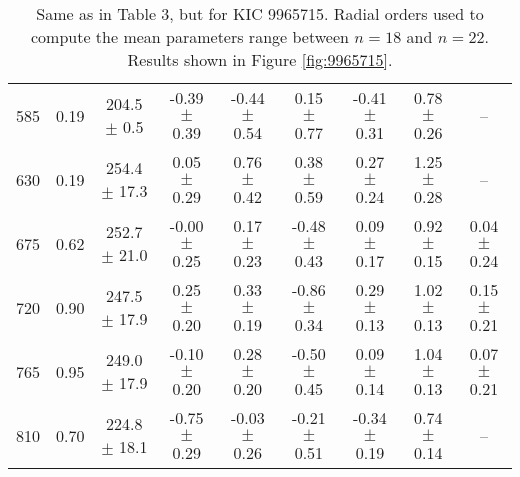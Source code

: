 \documentclass[twocolumn]{aastex61}%
\begin{document}
\begin{table*}[ht]
\begin{tabular}{ccc|ccccc|c}
585 & 0.19 & 204.5 $\pm$ 0.5 & -0.39 $\pm$ 0.39 & -0.44 $\pm$ 0.54 & 0.15 $\pm$ 0.77 & -0.41 $\pm$ 0.31 & 0.78 $\pm$ 0.26 & --\\
630 & 0.19 & 254.4 $\pm$ 17.3 & 0.05 $\pm$ 0.29 & 0.76 $\pm$ 0.42 & 0.38 $\pm$ 0.59 & 0.27 $\pm$ 0.24 & 1.25 $\pm$ 0.28 & --\\
675 & 0.62 & 252.7 $\pm$ 21.0 & -0.00 $\pm$ 0.25 & 0.17 $\pm$ 0.23 & -0.48 $\pm$ 0.43 & 0.09 $\pm$ 0.17 & 0.92 $\pm$ 0.15 & 0.04 $\pm$ 0.24\\
720 & 0.90 & 247.5 $\pm$ 17.9 & 0.25 $\pm$ 0.20 & 0.33 $\pm$ 0.19 & -0.86 $\pm$ 0.34 & 0.29 $\pm$ 0.13 & 1.02 $\pm$ 0.13 & 0.15 $\pm$ 0.21\\
765 & 0.95 & 249.0 $\pm$ 17.9 & -0.10 $\pm$ 0.20 & 0.28 $\pm$ 0.20 & -0.50 $\pm$ 0.45 & 0.09 $\pm$ 0.14 & 1.04 $\pm$ 0.13 & 0.07 $\pm$ 0.21\\
810 & 0.70 & 224.8 $\pm$ 18.1 & -0.75 $\pm$ 0.29 & -0.03 $\pm$ 0.26 & -0.21 $\pm$ 0.51 & -0.34 $\pm$ 0.19 & 0.74 $\pm$ 0.14 & --\\
\end{tabular}
\caption{Same as in Table 3, but for KIC 9965715. Radial orders used to compute the mean parameters range between $n=18$ and $n=22$. Results shown in Figure \ref{fig:9965715}.}\label{tab:9965715}
\end{table*}
\end{document}
